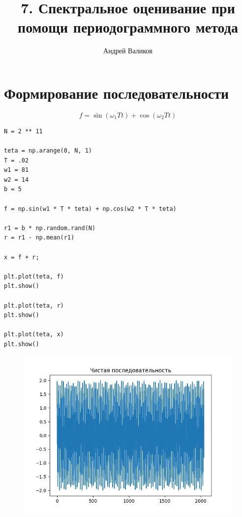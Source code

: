 \documentclass[12pt]{article}
\begin{document}
\title{7. Спектральное оценивание при помощи периодограммного метода}
\author{Андрей Валиков}
\date{}
\maketitle
																																																							


\section{Формирование последовательности}


\[f = \sin(\omega_1 Tt) + \cos(\omega_2 Tt)\]


\begin{lstlisting}
N = 2 ** 11

teta = np.arange(0, N, 1)
T = .02
w1 = 81
w2 = 14
b = 5

f = np.sin(w1 * T * teta) + np.cos(w2 * T * teta)

r1 = b * np.random.rand(N)
r = r1 - np.mean(r1)

x = f + r;

plt.plot(teta, f)
plt.show()

plt.plot(teta, r)
plt.show()

plt.plot(teta, x)
plt.show()
\end{lstlisting}


\begin{figure}[!htb]
\centering
\includegraphics[scale=1.00]{good.png}
\caption{}
\label{}
\end{figure}
\end{document}
